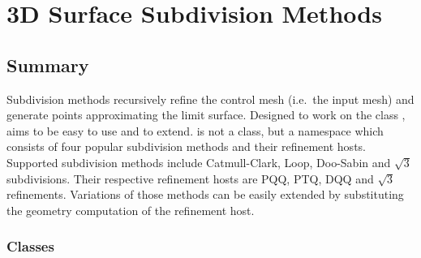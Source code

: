 
\chapter{3D Surface Subdivision Methods}
\label{chapterSubdivisionRef}


\section*{Summary}

Subdivision methods recursively refine the control mesh 
(i.e.~the input mesh) and generate points approximating 
the limit surface. 
Designed to work on the class ,
 aims to be easy to use and to extend.
 is not a class, but a namespace 
which consists of four popular subdivision methods and their refinement
hosts. Supported subdivision methods include Catmull-Clark, Loop, 
Doo-Sabin and $\sqrt{3}$ subdivisions. Their respective refinement 
hosts are PQQ, PTQ, DQQ and $\sqrt{3}$ refinements.
Variations of those methods can be easily 
extended by substituting the geometry computation of the refinement
host.


\subsection*{Classes}

